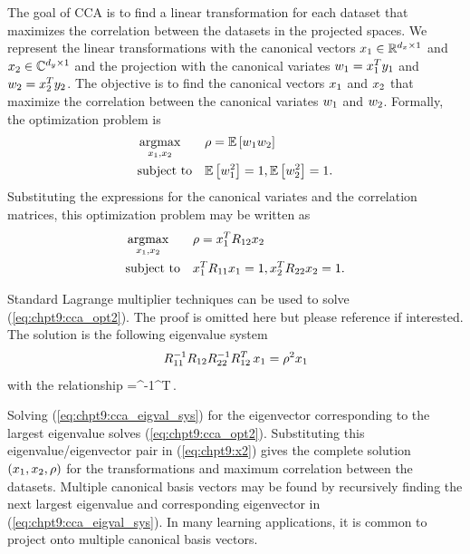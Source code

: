 The goal of CCA is to find a linear transformation for each dataset that maximizes the
correlation between the datasets in the projected spaces. We represent the linear
transformations with the canonical vectors $x_1\in\mathbb{R}^{d_x\times 1}$ and
$x_2\in\mathbb{C}^{d_y\times 1}$ and the projection with the canonical variates $w_1=x_1^Ty_1$ and
$w_2=x_2^Ty_2$. The objective is to find the canonical vectors $x_1$ and $x_2$ that
maximize the correlation between the canonical variates $w_1$ and $w_2$. Formally, the
optimization problem is
\begin{equation}\label{eq:chpt9:cca_opt}
  \begin{aligned}
    &\argmax_{\xI,\xII}&&\rho = \E{\wI\wII}\\
    & \text{subject to}&&\E{\wI^2}=1, \E{\wII^2}=1.
  \end{aligned}
\end{equation}
Substituting the expressions for the canonical variates and the correlation matrices, this
optimization problem may be written as
\begin{equation}\label{eq:chpt9:cca_opt2}
  \begin{aligned}
    &\argmax_{\xI,\xII}&&\rho = \xI^T\RIII\xII\\
    & \text{subject to}&&\xI^T\RI\xI=1, \xII^T\RII\xII=1.
  \end{aligned}
\end{equation}

Standard Lagrange multiplier techniques can be used to solve (\ref{eq:chpt9:cca_opt2}). The
proof is omitted here but please reference
\cite{nielsen2002multiset,nadakuditi2011fundamental,welling2005kcca,kettenring1971canonical,nielsen1994analysis}
if interested. The solution is the following eigenvalue system
\begin{equation}\label{eq:chpt9:cca_eigval_sys}
  \RI^{-1}\RIII\RII^{-1}\RIII^T\,\xI = \rho^2\xI
\end{equation}
with the relationship
\beq\label{eq:chpt9:x2}
\xII=\RII^{-1}\RIII^T\,\xI.
\eeq

Solving (\ref{eq:chpt9:cca_eigval_sys}) for the eigenvector corresponding to the largest
eigenvalue solves (\ref{eq:chpt9:cca_opt2}). Substituting this eigenvalue/eigenvector pair in
(\ref{eq:chpt9:x2}) gives the complete solution $\left(x_1,x_2,\rho\right)$ for the transformations
  and maximum correlation between the datasets. Multiple canonical basis vectors may be
  found by recursively finding the next largest eigenvalue and corresponding eigenvector
  in (\ref{eq:chpt9:cca_eigval_sys}). In many learning applications, it is common to project
  onto multiple canonical basis vectors.

